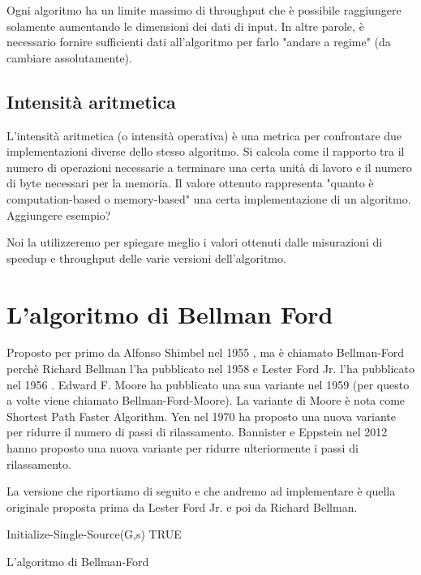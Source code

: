 \documentclass[a4paper]{article}
\begin{document}
	Ogni algoritmo ha un limite massimo di throughput che è possibile raggiungere solamente aumentando le dimensioni dei dati di input. In altre parole, è necessario fornire sufficienti dati all'algoritmo per farlo "andare a regime" (da cambiare assolutamente).
	
	\subsection{Intensità aritmetica}
	L'intensità aritmetica (o intensità operativa) è una metrica per confrontare due implementazioni diverse dello stesso algoritmo. Si calcola come il rapporto tra il numero di operazioni necessarie a terminare una certa unità di lavoro e il numero di byte necessari per la memoria. Il valore ottenuto rappresenta "quanto è computation-based o memory-based" una certa implementazione di un algoritmo. Aggiungere esempio?
	
	Noi la utilizzeremo per spiegare meglio i valori ottenuti dalle misurazioni di speedup e throughput delle varie versioni dell'algoritmo.
	
	\section{L'algoritmo di Bellman Ford}
	\label{section:analisi}
	Proposto per primo da Alfonso Shimbel nel 1955 \cite{Shimbel1955}, ma è chiamato Bellman-Ford perchè Richard Bellman l'ha pubblicato nel 1958 \cite{Bellman1958} e Lester Ford Jr. l'ha pubblicato nel 1956 \cite{Ford1956}. Edward F. Moore ha pubblicato una sua variante nel 1959 \cite{Moore1959} (per questo a volte viene chiamato Bellman-Ford-Moore). La variante di Moore è nota come Shortest Path Faster Algorithm. Yen nel 1970 \cite{Yen1970} ha proposto una nuova variante per ridurre il numero di passi di rilassamento. Bannister e Eppstein nel 2012 \cite{Bannister2012} hanno proposto una nuova variante per ridurre ulteriormente i passi di rilassamento.
	
	La versione che riportiamo di seguito e che andremo ad implementare è quella originale proposta prima da Lester Ford Jr. e poi da Richard Bellman.
	
	\begin{algorithm}[H]
		\label{alg:bf}
		Initialize-Single-Source(G,s)\;
		\Return TRUE\;
		\caption{L'algoritmo di Bellman-Ford}
	\end{algorithm}
\end{document}

